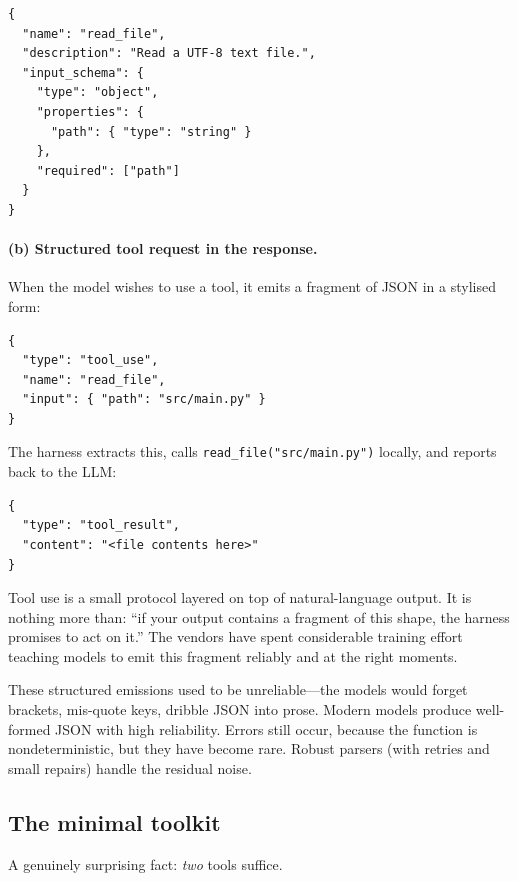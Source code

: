 \begin{lstlisting}
{
  "name": "read_file",
  "description": "Read a UTF-8 text file.",
  "input_schema": {
    "type": "object",
    "properties": {
      "path": { "type": "string" }
    },
    "required": ["path"]
  }
}
\end{lstlisting}

\paragraph{(b) Structured tool request in the response.}
When the model wishes to use a tool, it emits a fragment of
JSON in a stylised form:

\begin{lstlisting}
{
  "type": "tool_use",
  "name": "read_file",
  "input": { "path": "src/main.py" }
}
\end{lstlisting}

The harness extracts this, calls \texttt{read\_file("src/main.py")}
locally, and reports back to the LLM:

\begin{lstlisting}
{
  "type": "tool_result",
  "content": "<file contents here>"
}
\end{lstlisting}

\begin{intuition}
  Tool use is a small protocol layered on top of natural-language
  output.  It is nothing more than: ``if your output contains a
  fragment of this shape, the harness promises to act on it.''
  The vendors have spent considerable training effort teaching
  models to emit this fragment reliably and at the right moments.
\end{intuition}

\begin{remark}[On reliability]
  These structured emissions used to be unreliable---the
  models would forget brackets, mis-quote keys, dribble JSON
  into prose.  Modern models produce well-formed JSON with
  high reliability.  Errors still occur, because the function
  is nondeterministic, but they have become rare.  Robust
  parsers (with retries and small repairs) handle the residual
  noise.
\end{remark}

\subsection{The minimal toolkit}

A genuinely surprising fact: \emph{two} tools suffice.

